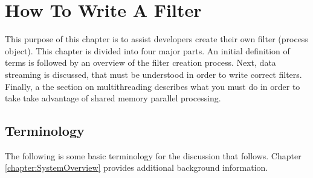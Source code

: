 \chapter{How To Write A Filter}
\label{chapter:WriteAFilter}

This purpose of this chapter is to assist developers create their own filter
(process object).  This chapter is divided into four major parts. An initial
definition of terms is followed by an overview of the filter creation
process. Next, data streaming is discussed, that must be understood in order
to write correct filters. Finally, a the section on multithreading describes
what you must do in order to take take advantage of shared memory parallel
processing.

\section{Terminology}
\label{sec:Terminology}

The following is some basic terminology for the discussion that follows.
Chapter \ref{chapter:SystemOverview} provides additional background
information.

